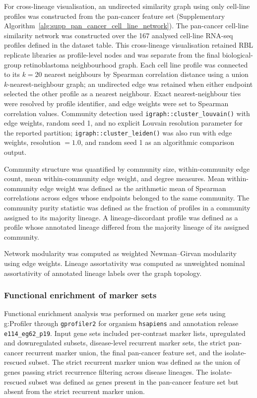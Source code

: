 For cross-lineage visualisation, an undirected similarity graph using only
cell-line profiles was constructed from the pan-cancer feature set (Supplementary
Algorithm~\ref{alg:supp_pan_cancer_cell_line_network}).
The pan-cancer cell-line similarity network was constructed over the 167
analysed cell-line RNA-seq profiles defined in the dataset table. This
cross-lineage visualisation retained RBL replicate libraries as profile-level
nodes and was separate from the final biological-group retinoblastoma
neighbourhood graph.
Each cell line profile was connected to its \(k = 20\) nearest neighbours by
Spearman correlation distance using a union \(k\)-nearest-neighbour graph; an
undirected edge was retained when either endpoint selected the other profile as
a nearest neighbour. Exact nearest-neighbour ties were resolved by profile
identifier, and edge weights were set to Spearman correlation values. Community
detection used \texttt{igraph::cluster\_louvain()} with edge weights,
random seed 1, and no explicit Louvain resolution parameter for the reported partition;
\texttt{igraph::cluster\_leiden()} was also run with edge weights, resolution
\(=1.0\), and random seed 1 as an algorithmic comparison output.

Community structure was quantified by community size, within-community edge
count, mean within-community edge weight, and degree measures. Mean
within-community edge weight was defined as the arithmetic mean of Spearman
correlations across edges whose endpoints belonged to the same community.
The community purity statistic was defined as the fraction of profiles in a community assigned
to its majority lineage. A lineage-discordant profile was defined as a profile
whose annotated lineage differed from the majority lineage of its assigned
community.

Network modularity was computed as weighted Newman--Girvan modularity using
edge weights. Lineage assortativity was computed as unweighted nominal
assortativity of annotated lineage labels over the graph topology.

\subsubsection{Functional enrichment of marker sets}

Functional enrichment analysis was performed on marker gene sets using
g:Profiler through \texttt{gprofiler2} for organism \texttt{hsapiens} and
annotation release \texttt{e114\_eg62\_p19}. Input gene sets included
per-contrast marker lists, upregulated and downregulated subsets, disease-level
recurrent marker sets, the strict pan-cancer recurrent marker union, the final
pan-cancer feature set, and the isolate-rescued subset. The strict recurrent
marker union was defined as the union of genes passing strict recurrence
filtering across disease lineages. The isolate-rescued subset was defined as
genes present in the pan-cancer feature set but absent from the strict recurrent
marker union.

